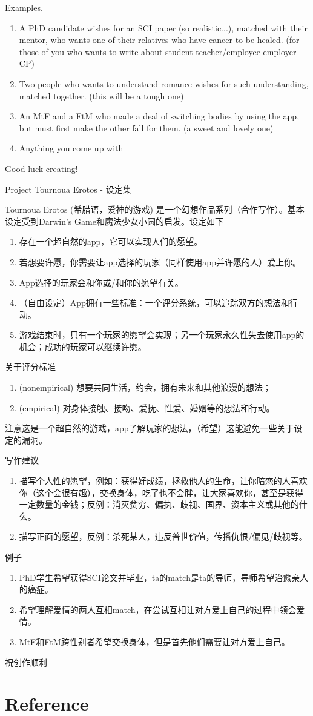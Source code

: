 \documentclass[10pt]{report}
\theoremstyle{definition}
\begin{document}
Examples.
\begin{enumerate}
\item
A PhD candidate wishes for an SCI paper (so realistic...), matched with their mentor, who wants one of their relatives who have cancer to be healed. (for those of you who wants to write about student-teacher/employee-employer CP)
\item
Two people who wants to understand romance wishes for such understanding, matched together. (this will be a tough one)
\item
An MtF and a FtM who made a deal of switching bodies by using the app, but must first make the other fall for them. (a sweet and lovely one)
\item
Anything you come up with~
\end{enumerate}

Good luck creating!

\newpage
{\Large Project Tournoua Erotos - 设定集}

Tournoua Erotos (希腊语，爱神的游戏) 是一个幻想作品系列（合作写作）。基本设定受到Darwin's Game和魔法少女小圆的启发。设定如下
\begin{enumerate}
\item
存在一个超自然的app，它可以实现人们的愿望。
\item
若想要许愿，你需要让app选择的玩家（同样使用app并许愿的人）爱上你。
\item
App选择的玩家会和你或/和你的愿望有关。
\item
（自由设定）App拥有一些标准：一个评分系统，可以追踪双方的想法和行动。
\item
游戏结束时，只有一个玩家的愿望会实现；另一个玩家永久性失去使用app的机会；成功的玩家可以继续许愿。
\end{enumerate}

关于评分标准
\begin{enumerate}
\item (nonempirical) 想要共同生活，约会，拥有未来和其他浪漫的想法；
\item (empirical) 对身体接触、接吻、爱抚、性爱、婚姻等的想法和行动。
\end{enumerate}
注意这是一个超自然的游戏，app了解玩家的想法，（希望）这能避免一些关于设定的漏洞。

写作建议
\begin{enumerate}
\item
描写个人性的愿望，例如：获得好成绩，拯救他人的生命，让你暗恋的人喜欢你（这个会很有趣），交换身体，吃了也不会胖，让大家喜欢你，甚至是获得一定数量的金钱；反例：消灭贫穷、偏执、歧视、国界、资本主义或其他的什么。
\item
描写正面的愿望，反例：杀死某人，违反普世价值，传播仇恨/偏见/歧视等。
\end{enumerate}

例子
\begin{enumerate}
\item
PhD学生希望获得SCI论文并毕业，ta的match是ta的导师，导师希望治愈亲人的癌症。
\item
希望理解爱情的两人互相match，在尝试互相让对方爱上自己的过程中领会爱情。
\item
MtF和FtM跨性别者希望交换身体，但是首先他们需要让对方爱上自己。
\end{enumerate}

祝创作顺利~

\chapter*{Reference}
\printbibliography
\end{document}
